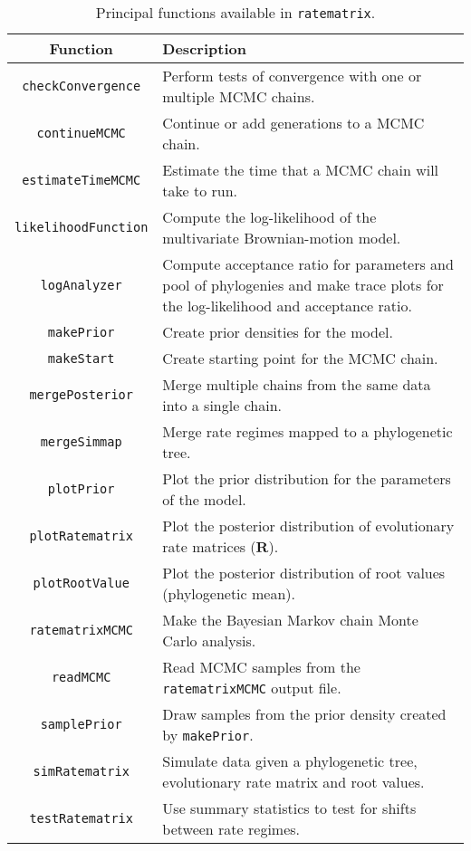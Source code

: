 \pagebreak

\begin{table}[h]
\caption[Principal functions available in \texttt{ratematrix}.]{Principal functions available in \texttt{ratematrix}.}
\label{tab:functions}
\begin{center}
\begin{tabularx}{\textwidth}{cX}
\hline 
Function & Description \\ 
\hline 
\texttt{checkConvergence}  & Perform tests of convergence with one or multiple MCMC chains. \\ 
\texttt{continueMCMC}  & Continue or add generations to a MCMC chain. \\
\texttt{estimateTimeMCMC}  & Estimate the time that a MCMC chain will take to run. \\
\texttt{likelihoodFunction}  & Compute the log-likelihood of the multivariate Brownian-motion model. \\
\texttt{logAnalyzer}  & Compute acceptance ratio for parameters and pool of phylogenies and make trace plots for the log-likelihood and acceptance ratio. \\
\texttt{makePrior} & Create prior densities for the model. \\
\texttt{makeStart} & Create starting point for the MCMC chain. \\
\texttt{mergePosterior} & Merge multiple chains from the same data into a single chain. \\
\texttt{mergeSimmap} & Merge rate regimes mapped to a phylogenetic tree. \\
\texttt{plotPrior} & Plot the prior distribution for the parameters of the model. \\
\texttt{plotRatematrix} & Plot the posterior distribution of evolutionary rate matrices ($\mathbf{R}$). \\  
\texttt{plotRootValue} & Plot the posterior distribution of root values (phylogenetic mean). \\
\texttt{ratematrixMCMC} & Make the Bayesian Markov chain Monte Carlo analysis. \\
\texttt{readMCMC} & Read MCMC samples from the \texttt{ratematrixMCMC} output file. \\
\texttt{samplePrior} & Draw samples from the prior density created by \texttt{makePrior}. \\
\texttt{simRatematrix} & Simulate data given a phylogenetic tree, evolutionary rate matrix and root values. \\
\texttt{testRatematrix} & Use summary statistics to test for shifts between rate regimes. \\
\hline
\end{tabularx} 
\end{center}
\end{table}

